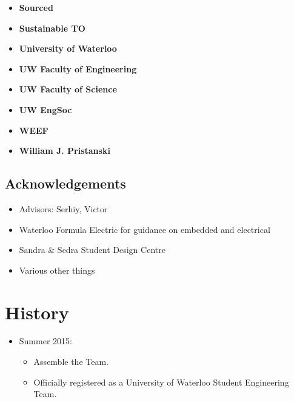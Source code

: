 \documentclass[main.tex]{subfiles}
\begin{document}
\begin{flushleft}
\begin{multicols}{3}
\begin{itemize}[label={},noitemsep]
    \item \textbf{Sourced}
    \item \textbf{Sustainable TO}
    \item \textbf{University of Waterloo}
    \end{itemize}
\end{multicols}

\begin{multicols}{3}
\begin{itemize}[label={},noitemsep]
    \item \textbf{UW Faculty of Engineering}
    \item \textbf{UW Faculty of Science}
    \item \textbf{UW EngSoc}
    \end{itemize}
\end{multicols}

\begin{multicols}{2}
\begin{itemize}[label={},noitemsep]
    \item \textbf{WEEF}
    \item \textbf{William J. Pristanski}
    \end{itemize}
\end{multicols}

\subsection{Acknowledgements}

\begin{itemize}
    \item Advisors: Serhiy, Victor
    \item Waterloo Formula Electric for guidance on embedded and electrical
    \item Sandra \& Sedra Student Design Centre
    \item Various other things
\end{itemize}
\section{History}
\begin{itemize}

\item Summer 2015:
\begin{itemize}
    \item Assemble the Team.
    \item Officially registered as a University of Waterloo Student Engineering Team.
\end{itemize}


\end{itemize}
\end{flushleft}
\end{document}
